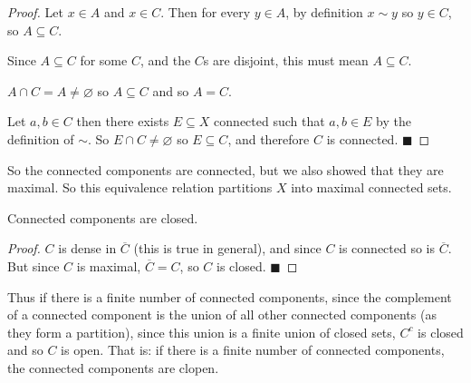 \documentclass[10pt]{article}
\def\qed{\hskip1cm\penalty-100\hbox{}\hfill$\blacksquare$}
\begin{document}
\begin{proof}

    \benum
        \item Let $x\in A$ and $x\in C$.
        Then for every $y\in A$, by definition $x\sim y$ so $y\in C$, so $A\subseteq C$.
        \item Since $A\subseteq C$ for some $C$, and the $C$s are disjoint, this must mean $A\subseteq C$.
        \item $A\cap C=A\neq\varnothing$ so $A\subseteq C$ and so $A=C$.
        \item Let $a,b\in C$ then there exists $E\subseteq X$ connected such that $a,b\in E$ by the definition of $\sim$.
        So $E\cap C\neq\varnothing$ so $E\subseteq C$, and therefore $C$ is connected.
        \qed
    \eenum

\end{proof}

So the connected components are connected, but we also showed that they are maximal.
So this equivalence relation partitions $X$ into maximal connected sets.

\begin{prop*}

    Connected components are closed.

\end{prop*}

\begin{proof}

    $C$ is dense in $\overline C$ (this is true in general), and since $C$ is connected so is $\overline C$.
    But since $C$ is maximal, $\overline C=C$, so $C$ is closed.
    \qed

\end{proof}

Thus if there is a finite number of connected components, since the complement of a connected component is the union of all other connected components (as they form a partition), since this union is a finite
union of closed sets, $C^c$ is closed and so $C$ is open.
That is: if there is a finite number of connected components, the connected components are clopen.
\end{document}
